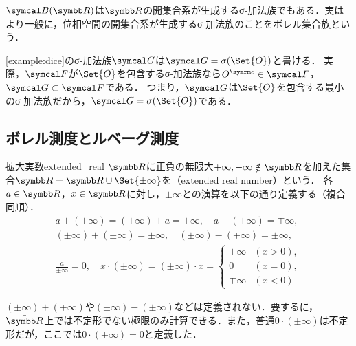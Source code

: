 \documentclass[../../main]{subfiles}
\begin{document}
\begin{note}
  \(\borelset{\numset{R}}\)は\(\numset{R}\)の開集合系が生成するσ‐加法族でもある．実はより一般に，位相空間の開集合系が生成するσ‐加法族のことをボレル集合族という．
\end{note}

\begin{example}
  \cref{example:dice}のσ‐加法族\(\sigmaalg{G}\)は\(\sigmaalg{G}=\sigmagen{\Set{O}}\)と書ける．
  実際，\(\sigmaalg{F}\)が\(\Set{O}\)を包含するσ‐加法族なら\(\scomp{O}\in\sigmaalg{F}\)，\(\sigmaalg{G}\subset\sigmaalg{F}\)である．
  つまり，\(\sigmaalg{G}\)は\(\Set{O}\)を包含する最小のσ‐加法族だから，\(\sigmaalg{G}=\sigmagen{\Set{O}}\)である．
\end{example}

\subsection{ボレル測度とルベーグ測度}

\begin{definition}{拡大実数}{extended_real}
  \(\numset{R}\)に正負の無限大\(+\infty,-\infty\notin\numset{R}\)を加えた集合\(\extendedreal=\numset{R}\cup\Set{\pm\infty}\)を（extended real number）という．
  各\(a\in\numset{R}\)，\(x\in\extendedreal\)に対し，\(\pm\infty\)との演算を以下の通り定義する（複合同順）．
  \begin{gather*}
    a+(\pm\infty) = (\pm\infty)+a = \pm\infty,
    \quad a-(\pm\infty) = \mp\infty, \\
    (\pm\infty)+(\pm\infty) = \pm\infty,
    \quad(\pm\infty)-(\mp\infty) = \pm\infty, \\
    \frac{a}{\pm\infty} = 0,
    \quad x\cdot(\pm\infty) = (\pm\infty)\cdot x = \begin{cases}\pm\infty & (x>0),\\ 0 & (x=0), \\ \mp\infty & (x<0)\end{cases}
  \end{gather*}
\end{definition}

\begin{note}
  \((\pm\infty)+(\mp\infty)\)や\((\pm\infty)-(\pm\infty)\)などは定義されない．要するに，\(\extendedreal\)上では不定形でない極限のみ計算できる．また，普通\(0\cdot(\pm\infty)\)は不定形だが，ここでは\(0\cdot(\pm\infty)=0\)と定義した．
\end{note}
\end{document}
